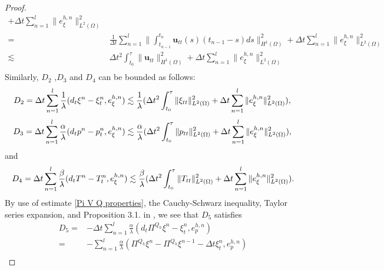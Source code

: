 \documentclass{article}
\numberwithin{equation}{section}
\begin{document}
\begin{proof}
\begin{equation*}
\begin{aligned}
             +    \Delta t \sum_{n=1}^l   \| e_{\xi}^{h,n} \|_{L^2(\Omega)}^2\\
 =&   \frac{1}{\Delta t} \sum_{n=1}^l
       \|\int_{t_{n-1}}^{t_n}\bm u_{tt}(s)(t_{n-1}-s)ds  \|_{H^1(\Omega)}^2
       +     \Delta t \sum_{n=1}^l        \| e_{\xi}^{h,n} \|_{L^2(\Omega)}^2  \\
 \lesssim&   
      \Delta t^2 \int_{t_0}^{\tau}\| \bm u_{tt}  \|_{H^1(\Omega)}^2
    + \Delta t \sum_{n=1}^l        \| e_{\xi}^{h,n} \|_{L^2(\Omega)}^2  \\        
\end{aligned}
\end{equation*} 
Similarly,   $D_2$ ,$D_3$ and  $D_4$ can be bounded as follows:  
\begin{equation*}  
   D_2=\Delta t \sum_{n=1}^l \frac{1}{\lambda}(d_t\xi^n- \xi_t^n, e_{\xi}^{h,n}) 
\lesssim   
    \frac1\lambda( \Delta t^2 \int_{t_0}^{\tau}\| \xi_{tt}  \|_{L^2(\Omega)}^2
    + \Delta t \sum_{n=1}^l        \| e_{\xi}^{h,n} \|_{L^2(\Omega)}^2  ),\\                                  
\end{equation*} 
\begin{equation*} 
   D_3=\Delta t \sum_{n=1}^l \frac{\alpha}{\lambda}(d_tp^n- p_t^n, e_{\xi}^{h,n}) 
\lesssim   
     \frac\alpha\lambda( \Delta t^2 \int_{t_0}^{\tau}\| p_{tt}  \|_{L^2(\Omega)}^2
    + \Delta t \sum_{n=1}^l        \| e_{\xi}^{h,n} \|_{L^2(\Omega)}^2 ) ,\\  
\end{equation*} 
and
\begin{equation*}  
   D_4=\Delta t \sum_{n=1}^l \frac{\beta}{\lambda}(d_tT^n- T_t^n, e_{\xi}^{h,n}) 
\lesssim   
    \frac\beta\lambda(  \Delta t^2 \int_{t_0}^{\tau}\| T_{tt}  \|_{L^2(\Omega)}^2
    + \Delta t \sum_{n=1}^l        \| e_{\xi}^{h,n} \|_{L^2(\Omega)}^2 ) .\\                                  
\end{equation*} 
By use of estimate \eqref{Pi V Q properties}, the Cauchy-Schwarz inequality,
Taylor series expansion, and Proposition 3.1. in \cite{gu2023priori}, we see that $D_5$ satisfies
\begin{equation*}    
\begin{aligned}  
 D_5=& - \Delta t \sum_{n=1}^l\frac\alpha\lambda(d_t\Pi^{Q_h} \xi^n- \xi_t^n , e_p^{h,n}) \\
 =& -\sum_{n=1}^l\frac\alpha\lambda( \Pi^{Q_h} \xi^n-\Pi^{Q_h} \xi^{n-1}-\Delta t \xi_t^n , e_p^{h,n})\\

\end{aligned}
\end{equation*}
\end{proof}
\end{document}
